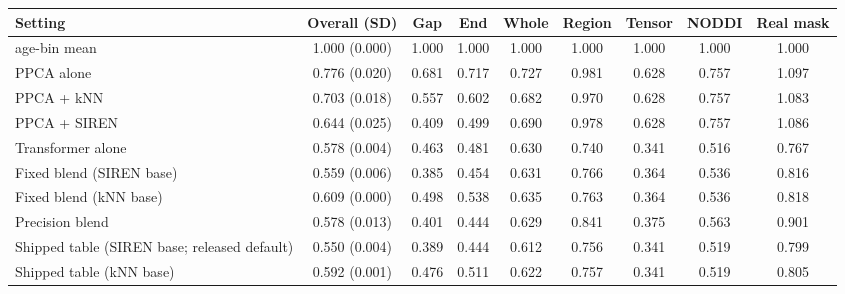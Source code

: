 \begin{tabular}{lcccccccc}
\toprule
Setting & Overall (SD) & Gap & End & Whole & Region & Tensor & NODDI & Real mask \\
\midrule
age-bin mean & 1.000 (0.000) & 1.000 & 1.000 & 1.000 & 1.000 & 1.000 & 1.000 & 1.000 \\
PPCA alone & 0.776 (0.020) & 0.681 & 0.717 & 0.727 & 0.981 & 0.628 & 0.757 & 1.097 \\
PPCA + kNN & 0.703 (0.018) & 0.557 & 0.602 & 0.682 & 0.970 & 0.628 & 0.757 & 1.083 \\
PPCA + SIREN & 0.644 (0.025) & 0.409 & 0.499 & 0.690 & 0.978 & 0.628 & 0.757 & 1.086 \\
Transformer alone & 0.578 (0.004) & 0.463 & 0.481 & 0.630 & 0.740 & 0.341 & 0.516 & 0.767 \\
Fixed blend (SIREN base) & 0.559 (0.006) & 0.385 & 0.454 & 0.631 & 0.766 & 0.364 & 0.536 & 0.816 \\
Fixed blend (kNN base) & 0.609 (0.000) & 0.498 & 0.538 & 0.635 & 0.763 & 0.364 & 0.536 & 0.818 \\
Precision blend & 0.578 (0.013) & 0.401 & 0.444 & 0.629 & 0.841 & 0.375 & 0.563 & 0.901 \\
Shipped table (SIREN base; released default) & 0.550 (0.004) & 0.389 & 0.444 & 0.612 & 0.756 & 0.341 & 0.519 & 0.799 \\
Shipped table (kNN base) & 0.592 (0.001) & 0.476 & 0.511 & 0.622 & 0.757 & 0.341 & 0.519 & 0.805 \\
\bottomrule
\end{tabular}
